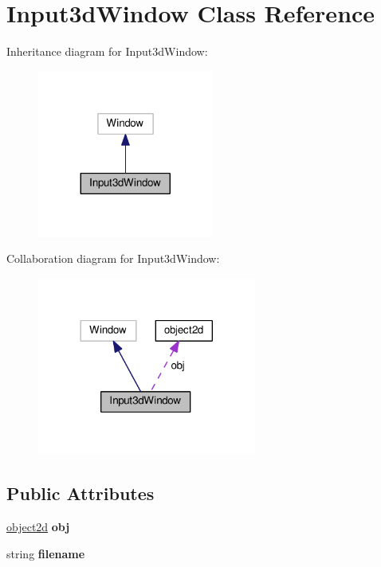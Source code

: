 \hypertarget{classInput3dWindow}{}\section{Input3d\+Window Class Reference}
\label{classInput3dWindow}


Inheritance diagram for Input3d\+Window\+:
\nopagebreak
\begin{figure}[H]
\begin{center}
\leavevmode
\includegraphics[width=164pt]{classInput3dWindow__inherit__graph}
\end{center}
\end{figure}


Collaboration diagram for Input3d\+Window\+:
\nopagebreak
\begin{figure}[H]
\begin{center}
\leavevmode
\includegraphics[width=204pt]{classInput3dWindow__coll__graph}
\end{center}
\end{figure}
\subsection*{Public Attributes}
\begin{DoxyCompactItemize}
\item 
\hyperlink{classobject2d}{object2d} {\bfseries obj}\hypertarget{classInput3dWindow_a2bd35358143316af1020cbccee0b9d7d}{}\label{classInput3dWindow_a2bd35358143316af1020cbccee0b9d7d}

\item 
string {\bfseries filename}\hypertarget{classInput3dWindow_a15f604279fd8d88c839c624925b45e10}{}\label{classInput3dWindow_a15f604279fd8d88c839c624925b45e10}

\end{DoxyCompactItemize}
